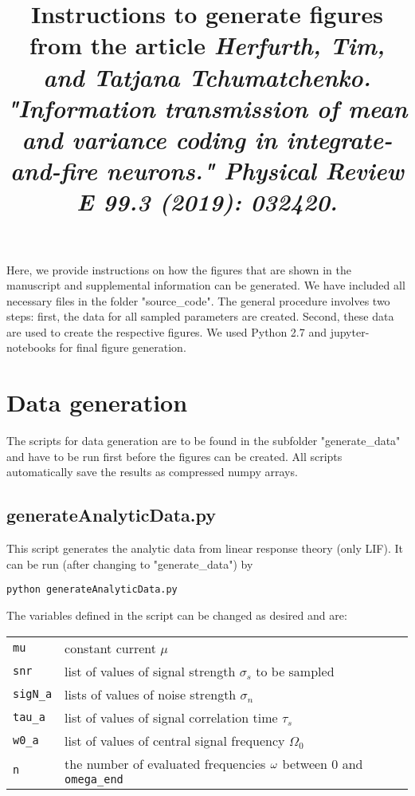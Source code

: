\documentclass{article}
\begin{document}
\title{Instructions to generate figures from the article \emph{Herfurth, Tim, and Tatjana Tchumatchenko. "Information transmission of mean and variance coding in integrate-and-fire neurons." Physical Review E 99.3 (2019): 032420.}}
\date{\vspace{-5ex}}
\maketitle
Here, we provide instructions on how the figures that are shown in the manuscript and supplemental information can be generated. We have included all necessary files in the folder "source\_code". The general procedure involves two steps: first, the data for all sampled parameters are created. Second, these data are used to create the respective figures. We used Python 2.7 and jupyter-notebooks for final figure generation.
\section{Data generation}
The scripts for data generation are to be found in the subfolder "generate\_data" and have to be run first before the figures can be created. All scripts automatically save the results as compressed numpy arrays.
\subsection{generateAnalyticData.py}
This script generates the analytic data from linear response theory (only LIF). It can be run (after changing to "generate\_data") by
\begin{verbatim}
python generateAnalyticData.py
\end{verbatim}
The variables defined in the script can be changed as desired and are:
\begin{table}[h]
\label{my-label}
\begin{tabular}{ll}
\verb!mu!  & constant current $\mu$\\
\verb!snr!    & list of values of signal strength $\sigma_s$ to be sampled \\
\verb!sigN_a!  & lists of values of noise strength $\sigma_n$\\
\verb!tau_a! & list of values of signal correlation time $\tau_s$\\
\verb!w0_a!  & list of values of central signal frequency $\Omega_0$\\
\verb!n!       & the number of evaluated frequencies $\omega$ between 0 and \verb!omega_end! \\

\end{tabular}
\end{table}
\end{document}
